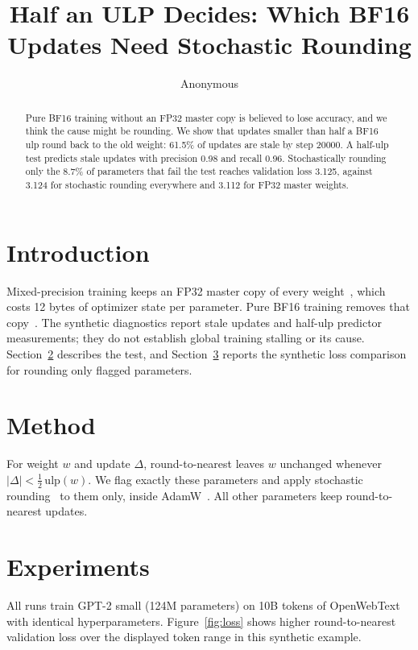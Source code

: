 \documentclass[11pt]{article}
\title{Half an ULP Decides: Which BF16 Updates Need Stochastic Rounding}
\author{Anonymous}
\begin{document}
\maketitle
\begin{abstract}
Pure BF16 training without an FP32 master copy is believed to lose accuracy, and we think the cause might be rounding.
We show that updates smaller than half a BF16 ulp round back to the old weight: 61.5\% of updates are stale by step 20000.
A half-ulp test predicts stale updates with precision 0.98 and recall 0.96.
Stochastically rounding only the 8.7\% of parameters that fail the test reaches validation loss 3.125, against 3.124 for stochastic rounding everywhere and 3.112 for FP32 master weights.
\end{abstract}

\section{Introduction}
\label{sec:intro}
Mixed-precision training keeps an FP32 master copy of every weight~\citep{micikevicius2018mixed}, which costs 12 bytes of optimizer state per parameter.
Pure BF16 training removes that copy~\citep{kalamkar2019study}.
The synthetic diagnostics report stale updates and half-ulp predictor measurements; they do not establish global training stalling or its cause.
Section~\ref{sec:method} describes the test, and Section~\ref{sec:experiments} reports the synthetic loss comparison for rounding only flagged parameters.

\section{Method}
\label{sec:method}
For weight $w$ and update $\Delta$, round-to-nearest leaves $w$ unchanged whenever $|\Delta| < \tfrac{1}{2}\,\mathrm{ulp}(w)$.
We flag exactly these parameters and apply stochastic rounding~\citep{gupta2015deep} to them only, inside AdamW~\citep{loshchilov2019decoupled}.
All other parameters keep round-to-nearest updates.

\section{Experiments}
\label{sec:experiments}
All runs train GPT-2 small (124M parameters) on 10B tokens of OpenWebText with identical hyperparameters.
Figure~\ref{fig:loss} shows higher round-to-nearest validation loss over the displayed token range in this synthetic example.
\end{document}
